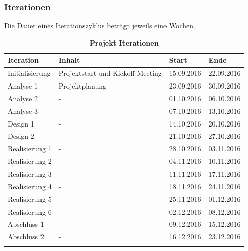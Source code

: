 \documentclass[a4,12pt]{scrartcl}
\begin{document}
\subsubsection{Iterationen}
Die Dauer eines Iterationszyklus beträgt jeweils eine Wochen. 
\begin{table}[htb]
\centering
    \begin{tabular}{@{} p{3cm} l l l@{}}\toprule    
    {Iteration} & {Inhalt} & {Start} & {Ende}\\ \midrule
    Initialisierung & Projektstart und Kickoff-Meeting & 15.09.2016  & 22.09.2016\\ \addlinespace
    Analyse 1 & Projektplanung  & 23.09.2016 & 30.09.2016\\ \addlinespace
    Analyse 2 & -  & 01.10.2016 & 06.10.2016\\ \addlinespace
    Analyse 3 & -  & 07.10.2016 & 13.10.2016\\ \addlinespace
    Design 1 & - & 14.10.2016 & 20.10.2016\\ \addlinespace
    Design 2 & - & 21.10.2016 & 27.10.2016\\ \addlinespace
    Realisierung 1 & - & 28.10.2016  & 03.11.2016\\ \addlinespace
    Realisierung 2 & - & 04.11.2016  & 10.11.2016\\ \addlinespace
    Realisierung 3 & - & 11.11.2016  & 17.11.2016\\ \addlinespace
    Realisierung 4 & - & 18.11.2016  & 24.11.2016\\ \addlinespace
    Realisierung 5 & - & 25.11.2016  & 01.12.2016\\ \addlinespace
    Realisierung 6 & - & 02.12.2016  & 08.12.2016\\ \addlinespace
    Abschluss 1 & - &  09.12.2016 & 15.12.2016\\ \addlinespace
    Abschluss 2 & - &  16.12.2016 & 23.12.2016\\ \addlinespace
    \bottomrule
    \end{tabular}
\caption{\textbf{Projekt Iterationen}}
\end{table}
\end{document}
